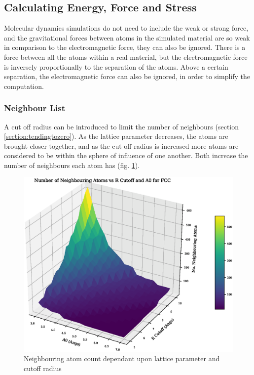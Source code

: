 \FloatBarrier
\subsection{Calculating Energy, Force and Stress}
\label{section:backgroundenergyforcestress}

Molecular dynamics simulations do not need to include the weak or strong force, and the gravitational forces between atoms in the simulated material are so weak in comparison to the electromagnetic force, they can also be ignored.  There is a force between all the atoms within a real material, but the electromagnetic force is inversely proportionally to the separation of the atoms.  Above a certain separation, the electromagnetic force can also be ignored, in order to simplify the computation.

\FloatBarrier
\subsubsection{Neighbour List}
\label{section:neighbourlist}

A cut off radius can be introduced to limit the number of neighbours (section \ref{section:tendingtozero}).  As the lattice parameter decreases, the atoms are brought closer together, and as the cut off radius is increased more atoms are considered to be within the sphere of influence of one another.  Both increase the number of neighbours each atom has (fig. \ref{fig:nlsize}).

\begin{figure}[tbp]
  \begin{center}
    \includegraphics[scale=0.40]{chapters/interatomic_potential_fitting/plots/atom_neighbours.eps}
    \caption{Neighbouring atom count dependant upon lattice parameter and cutoff radius}
    \label{fig:nlsize}
  \end{center}
\end{figure}

